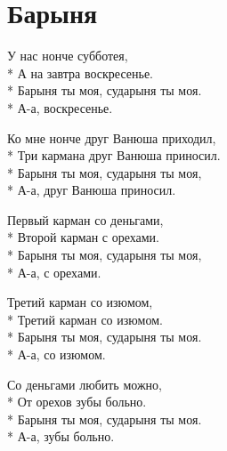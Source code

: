 \vspace{\fill}\newpage

\section{Барыня}
\label{song:Барыня}

\medskip

\begin{minipage}{\linewidth}
У нас нонче субботея,\\*
А на завтра воскресенье.\\*
Барыня ты моя, сударыня ты моя.\\*
А-а, воскресенье.\\
\end{minipage}\par\medskip\nobreak

\medskip

\begin{minipage}{\linewidth}
Ко мне нонче друг Ванюша приходил,\\*
Три кармана друг Ванюша приносил.\\*
Барыня ты моя, сударыня ты моя,\\*
А-а, друг Ванюша приносил.\\
\end{minipage}\par\medskip\nobreak

\medskip

\begin{minipage}{\linewidth}
Первый карман со деньгами,\\*
Второй карман с орехами.\\*
Барыня ты моя, сударыня ты моя,\\*
А-а, с орехами.\\
\end{minipage}\par\medskip\nobreak

\medskip

\begin{minipage}{\linewidth}
Третий карман со изюмом,\\*
Третий карман со изюмом.\\*
Барыня ты моя, сударыня ты моя.\\*
А-а, со изюмом.\\
\end{minipage}\par\medskip\nobreak

\medskip

\begin{minipage}{\linewidth}
Со деньгами любить можно,\\*
От орехов зубы больно.\\*
Барыня ты моя, сударыня ты моя.\\*
А-а, зубы больно.\\
\end{minipage}\par\medskip\nobreak

